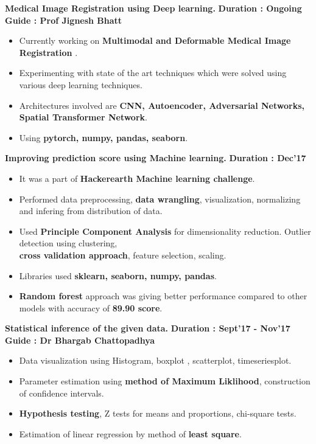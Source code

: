 \documentclass{article}
\begin{document}
\textbf{\large{Medical Image Registration using Deep learning.}} \hspace*{4.8cm}\textbf{Duration : Ongoing}\\ \textbf{Guide : Prof Jignesh Bhatt}
\begin{itemize}[noitemsep]
	\item Currently working on \textbf{Multimodal and Deformable Medical Image Registration} .
	\item Experimenting with state of the art techniques which were solved using various deep learning techniques.
	\item Architectures involved are \textbf{CNN, Autoencoder, Adversarial Networks, Spatial Transformer Network}.
	\item Using \textbf{pytorch, numpy, pandas, seaborn}.
	
\end{itemize}

\vspace*{0.50cm}
\textbf{\large{Improving prediction score using Machine learning.}} \hspace*{4.0cm}
\textbf{Duration : Dec'17}
\begin{itemize}[noitemsep]
	\item It was a part of \textbf{Hackerearth Machine learning challenge}.
	\item Performed data preprocessing, \textbf{data wrangling}, visualization, normalizing and infering from distribution of data.
	\item Used \textbf{Principle Component Analysis} for dimensionality reduction. Outlier detection using clustering,\\ \textbf{cross validation approach}, feature selection, scaling.
	\item Libraries used \textbf{sklearn, seaborn, numpy, pandas}.
	\item \textbf{Random forest} approach was giving better performance compared to other models with accuracy of \textbf{89.90 score}.
	
\end{itemize}
\vspace*{0.50cm}


\textbf{\large{Statistical inference of the given data.}} \hspace*{7cm}\textbf{Duration : Sept'17 - Nov'17}\\ \textbf{Guide : Dr Bhargab Chattopadhya}
\begin{itemize}[noitemsep]
	\item Data visualization using Histogram, boxplot , scatterplot, timeseriesplot.
	\item Parameter estimation using \textbf{method of Maximum Liklihood}, construction of confidence intervals.
	\item \textbf{Hypothesis testing}, Z tests for means and proportions, chi-square tests.
	\item Estimation of linear regression by method of \textbf{least square}.
	
\end{itemize}
\end{document}
